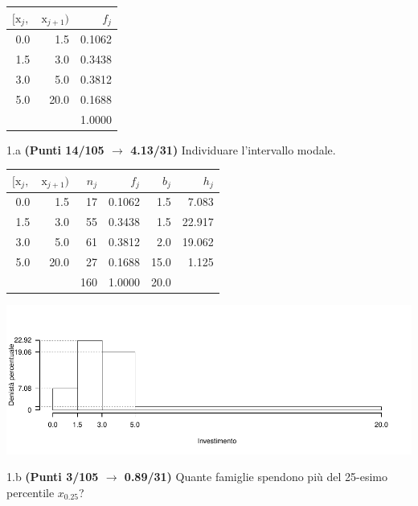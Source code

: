 \documentclass[
  11pt,
]{book}
\theoremstyle{mytheoremstyle}
\theoremstyle{mydefstyle}
\newenvironment{sol}
  {
  \begin{tcolorbox}[enhanced,breakable,arc=0.1mm,boxrule=1pt,colback=white,colframe=iblue,
  title=\bf \fontfamily{lmss}\selectfont \hspace{.5 cm} Soluzione,drop fuzzy shadow]

}{
\end{tcolorbox}
  }
\begin{document}
\begin{table}[H]
\centering
\begin{tabular}{rrr}
\toprule
$[\text{x}_j,$ & $\text{x}_{j+1})$ & $f_j$\\
\midrule
0.0 & 1.5 & 0.1062\\
1.5 & 3.0 & 0.3438\\
3.0 & 5.0 & 0.3812\\
5.0 & 20.0 & 0.1688\\
 &  & 1.0000\\
\bottomrule
\end{tabular}
\end{table}

1.a \textbf{(Punti 14/105 \(\rightarrow\) 4.13/31)} Individuare l'intervallo modale.

\begin{sol}

\begin{table}[H]
\centering
\begin{tabular}{rrrrrr}
\toprule
$[\text{x}_j,$ & $\text{x}_{j+1})$ & $n_j$ & $f_j$ & $b_j$ & $h_j$\\
\midrule
0.0 & 1.5 & 17 & 0.1062 & 1.5 & 7.083\\
1.5 & 3.0 & 55 & 0.3438 & 1.5 & 22.917\\
3.0 & 5.0 & 61 & 0.3812 & 2.0 & 19.062\\
5.0 & 20.0 & 27 & 0.1688 & 15.0 & 1.125\\
 &  & 160 & 1.0000 & 20.0 & \\
\bottomrule
\end{tabular}
\end{table}

\begin{center}\includegraphics{Esami_passati_con_soluzioni_files/figure-latex/2024-85-1} \end{center}

\end{sol}

1.b \textbf{(Punti 3/105 \(\rightarrow\) 0.89/31)} Quante famiglie spendono più del 25-esimo percentile \(x_{0.25}\)?
\end{document}
